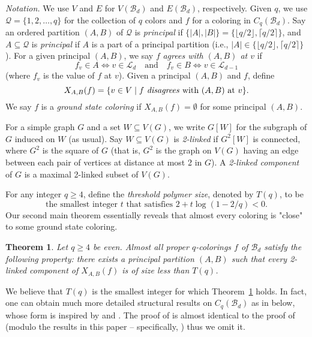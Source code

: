 \documentclass{amsart}
\newtheorem{thm}{Theorem}[section]
\theoremstyle{definition}
\newcommand{\cB}{\mathcal{B} }
\newcommand{\cL}{\mathcal{L} }
\newcommand{\cQ}{\mathcal{Q} }
\newcommand{\beq}[1]{\begin{equation}\label{#1}}
\newcommand{\enq}[0]{\end{equation}}
\newcommand{\sub}[0]{\subseteq}
\newcommand{\0}[0]{\emptyset}
\begin{document}
\noindent \textit{Notation.} We use $V$ and $E$ for $V(\cB_d)$ and $E(\cB_d)$, respectively. Given $q$, we use $\cQ=\{1,2,\ldots,q\}$ for the collection of $q$ colors and $f$ for a coloring in $C_q(\cB_d)$. Say an ordered partition $(A,B)$ of $\cQ$ is \textit{principal} if $\{|A|,|B|\}=\{\lfloor q/2 \rfloor, \lceil q/2 \rceil\}$, and $A \sub \cQ$ is \textit{principal} if $A$ is a part of a principal partition (i.e., $|A| \in \{\lfloor q/2 \rfloor, \lceil q/2 \rceil\}$).
For a given principal $(A,B)$, we say $f$ \textit{agrees with $(A,B)$ at $v$} if
\[
f_v \in A \Leftrightarrow v \in \cL_{d}
\quad\mbox{and}\quad
f_v \in B \Leftrightarrow v \in \cL_{d-1}
\]
(where $f_v$ is the value of $f$ at $v$). Given a principal $(A,B)$ and $f$, define
\begin{equation}\label{def:flaw}
X_{A,B}(f)=\{v\in V \mid \mbox{$f$ \textit{disagrees} with $(A,B)$ at $v$}\}.
\end{equation}
We say $f$ is a \textit{ground state coloring} if $X_{A,B}(f)=\emptyset$ for some principal $(A, B)$.

For a simple graph $G$ and a set $W \sub V(G)$, we write $G[W]$ for the subgraph of $G$ induced on $W$ (as usual). Say $W \sub V(G)$ is \textit{2-linked} if $G^2[W]$ is connected, where $G^2$ is the square of $G$ (that is, $G^2$ is the graph on $V(G)$ having an edge between each pair of vertices at distance at most 2 in $G$). A \textit{2-linked component} of $G$ is a maximal 2-linked subset of $V(G)$.

For any integer $q \ge 4$, define the \textit{threshold polymer size}, denoted by $T(q)$, to be 
\beq{def:threpolysize} \mbox{the smallest integer $t$ that satisfies $2+t\log(1-2/q)<0$.}\enq
Our second main theorem essentially reveals that almost every coloring is {"close"} to some {ground state coloring}.

\begin{thm}\label{realMT2}
Let $q \ge 4$ be even. Almost all proper $q$-colorings $f$ of $\cB_d$ satisfy the following property: there exists a principal partition $(A,B)$ such that every 2-linked component of $X_{A,B}(f)$ is of size less than $T(q)$. 
\end{thm}
We believe that $T(q)$ is the smallest integer for which Theorem~\ref{realMT2} holds.
In fact, one can obtain much more detailed structural results on $C_q(\cB_d)$ as in  below, whose form is inspired by \cite[Theorem 1.2]{EG} and \cite[Theorem 13.2]{JK}. The proof of  is almost identical to the proof of \cite[Theorem 13.2]{JK}  (modulo the results in this paper -- specifically, ) thus we omit it.
\end{document}
